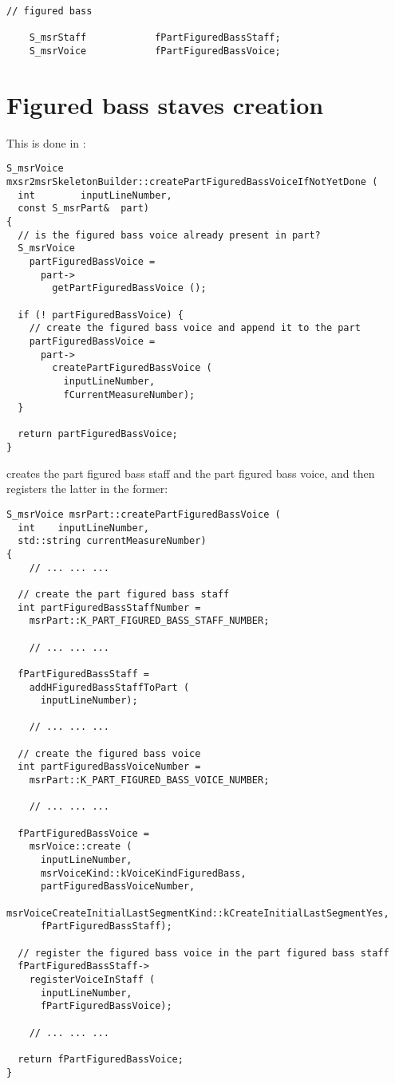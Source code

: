 \begin{lstlisting}[language=CPlusPlus]
    // figured bass

    S_msrStaff            fPartFiguredBassStaff;
    S_msrVoice            fPartFiguredBassVoice;
\end{lstlisting}


\section{Figured bass staves creation}

This is done in :
\begin{lstlisting}[language=CPlusPlus]
S_msrVoice mxsr2msrSkeletonBuilder::createPartFiguredBassVoiceIfNotYetDone (
  int        inputLineNumber,
  const S_msrPart&  part)
{
  // is the figured bass voice already present in part?
  S_msrVoice
    partFiguredBassVoice =
      part->
        getPartFiguredBassVoice ();

  if (! partFiguredBassVoice) {
    // create the figured bass voice and append it to the part
    partFiguredBassVoice =
      part->
        createPartFiguredBassVoice (
          inputLineNumber,
          fCurrentMeasureNumber);
  }

  return partFiguredBassVoice;
}
\end{lstlisting}

 creates the part figured bass staff and the part figured bass voice, and then registers the latter in the former:
\begin{lstlisting}[language=CPlusPlus]
S_msrVoice msrPart::createPartFiguredBassVoice (
  int    inputLineNumber,
  std::string currentMeasureNumber)
{
	// ... ... ...

  // create the part figured bass staff
  int partFiguredBassStaffNumber =
    msrPart::K_PART_FIGURED_BASS_STAFF_NUMBER;

	// ... ... ...

  fPartFiguredBassStaff =
    addHFiguredBassStaffToPart (
      inputLineNumber);

	// ... ... ...

  // create the figured bass voice
  int partFiguredBassVoiceNumber =
    msrPart::K_PART_FIGURED_BASS_VOICE_NUMBER;

	// ... ... ...

  fPartFiguredBassVoice =
    msrVoice::create (
      inputLineNumber,
      msrVoiceKind::kVoiceKindFiguredBass,
      partFiguredBassVoiceNumber,
      msrVoiceCreateInitialLastSegmentKind::kCreateInitialLastSegmentYes,
      fPartFiguredBassStaff);

  // register the figured bass voice in the part figured bass staff
  fPartFiguredBassStaff->
    registerVoiceInStaff (
      inputLineNumber,
      fPartFiguredBassVoice);

	// ... ... ...

  return fPartFiguredBassVoice;
}
\end{lstlisting}


